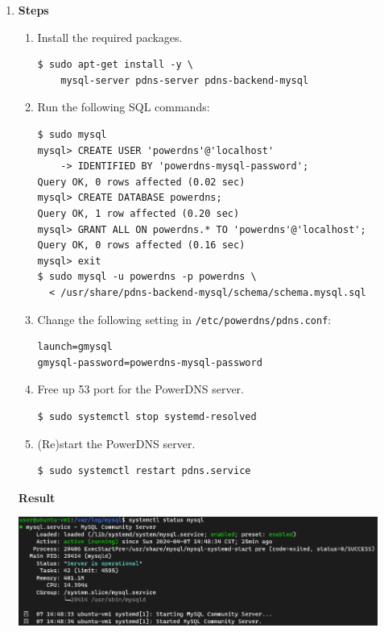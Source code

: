 \documentclass[12pt, a4paper]{article}
\begin{document}
  \begin{enumerate}
    \item
    \textbf{Steps}
    \begin{enumerate}
      \item Install the required packages.
      \begin{verbatim}
$ sudo apt-get install -y \
    mysql-server pdns-server pdns-backend-mysql
      \end{verbatim}
      \item Run the following SQL commands:
      \begin{Verbatim}[frame=single]
$ sudo mysql
mysql> CREATE USER 'powerdns'@'localhost'
    -> IDENTIFIED BY 'powerdns-mysql-password';
Query OK, 0 rows affected (0.02 sec)
mysql> CREATE DATABASE powerdns;
Query OK, 1 row affected (0.20 sec)
mysql> GRANT ALL ON powerdns.* TO 'powerdns'@'localhost';
Query OK, 0 rows affected (0.16 sec)
mysql> exit
$ sudo mysql -u powerdns -p powerdns \
  < /usr/share/pdns-backend-mysql/schema/schema.mysql.sql
      \end{Verbatim}
      \item Change the following setting in \verb|/etc/powerdns/pdns.conf|:
      \begin{Verbatim}[frame=single]
launch=gmysql
gmysql-password=powerdns-mysql-password
      \end{Verbatim}
      \item Free up 53 port for the PowerDNS server.
      \begin{verbatim}
$ sudo systemctl stop systemd-resolved
      \end{verbatim}
      \item (Re)start the PowerDNS server.
      \begin{verbatim}
$ sudo systemctl restart pdns.service
      \end{verbatim}
    \end{enumerate}

    \pagebreak
    \textbf{Result}

    \includegraphics[width=0.93\textwidth]{4-1_status_mysql.png}


\end{enumerate}
\end{document}
